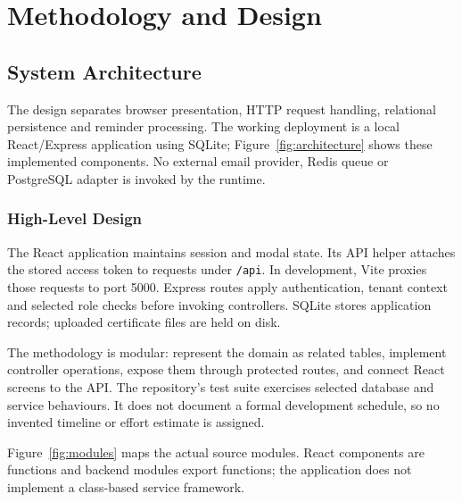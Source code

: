 \chapter{Methodology and Design}
\section{System Architecture}
The design separates browser presentation, HTTP request handling, relational persistence and reminder processing. The working deployment is a local React/Express application using SQLite; Figure~\ref{fig:architecture} shows these implemented components. No external email provider, Redis queue or PostgreSQL adapter is invoked by the runtime.

\subsection{High-Level Design}
The React application maintains session and modal state. Its API helper attaches the stored access token to requests under \texttt{/api}. In development, Vite proxies those requests to port 5000. Express routes apply authentication, tenant context and selected role checks before invoking controllers. SQLite stores application records; uploaded certificate files are held on disk.

The methodology is modular: represent the domain as related tables, implement controller operations, expose them through protected routes, and connect React screens to the API. The repository's test suite exercises selected database and service behaviours. It does not document a formal development schedule, so no invented timeline or effort estimate is assigned.

Figure~\ref{fig:modules} maps the actual source modules. React components are functions and backend modules export functions; the application does not implement a class-based service framework.

